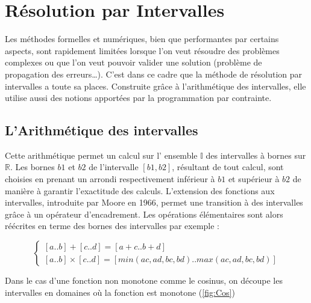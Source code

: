 \section{Résolution par Intervalles}
Les méthodes formelles et numériques, bien que performantes par certains aspects, sont rapidement limitées lorsque l'on veut résoudre des problèmes complexes ou que l'on veut pouvoir valider une solution (problème de propagation des erreurs\dots). C'est dans ce cadre que la méthode de résolution par intervalles a toute sa places. Construite grâce à l'arithmétique des intervalles, elle utilise aussi des notions apportées par la programmation par contrainte.
 
\subsection{L'Arithmétique des intervalles}
Cette arithmétique permet un calcul sur l' ensemble $\mathbb{I}$ des intervalles à bornes sur $\mathbb{R}$. Les bornes $b1$ et $b2$ de l'intervalle $[b1,b2]$, résultant de tout calcul, sont choisies en prenant un arrondi respectivement inférieur à $b1$ et supérieur à $b2$ de manière à garantir l'exactitude des calculs. L'extension des fonctions aux intervalles, introduite par Moore en 1966, permet une transition à des intervalles grâce à un opérateur d'encadrement. Les opérations élémentaires sont alors réécrites en terme des bornes des intervalles  par exemple : 

\begin{equation}\label{eq}
\begin{cases}
[a .. b] + [c .. d] = [a + c .. b + d] \\
[a .. b] × [c .. d] = [min(ac, ad, bc, bd) .. max(ac, ad, bc, bd)]
\end{cases}
\end{equation}

Dans le cas d’une fonction non monotone comme le cosinus, on découpe les intervalles en domaines où la fonction est monotone  (\ref{fig:Cos})

